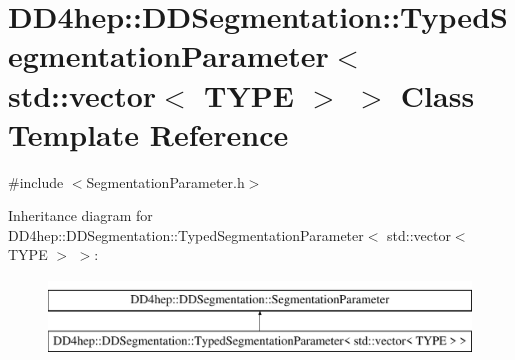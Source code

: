 \hypertarget{class_d_d4hep_1_1_d_d_segmentation_1_1_typed_segmentation_parameter_3_01std_1_1vector_3_01_t_y_p_e_01_4_01_4}{}\section{D\+D4hep\+:\+:D\+D\+Segmentation\+:\+:Typed\+Segmentation\+Parameter$<$ std\+:\+:vector$<$ T\+Y\+PE $>$ $>$ Class Template Reference}
\label{class_d_d4hep_1_1_d_d_segmentation_1_1_typed_segmentation_parameter_3_01std_1_1vector_3_01_t_y_p_e_01_4_01_4}


{\ttfamily \#include $<$Segmentation\+Parameter.\+h$>$}

Inheritance diagram for D\+D4hep\+:\+:D\+D\+Segmentation\+:\+:Typed\+Segmentation\+Parameter$<$ std\+:\+:vector$<$ T\+Y\+PE $>$ $>$\+:\begin{figure}[H]
\begin{center}
\leavevmode
\includegraphics[height=2.000000cm]{class_d_d4hep_1_1_d_d_segmentation_1_1_typed_segmentation_parameter_3_01std_1_1vector_3_01_t_y_p_e_01_4_01_4}
\end{center}
\end{figure}
